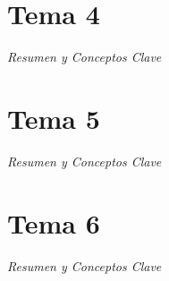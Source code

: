 \documentclass[a4paper,12pt]{article}
\begin{document}
\section{Tema 4}
\begin{center}
    \vspace*{2cm}
    \vspace*{1cm}
    \Large\textit{Resumen y Conceptos Clave}
    \vspace*{2cm}
\end{center}
\newpage


\section{Tema 5}
\begin{center}
    \vspace*{2cm}
    \vspace*{1cm}
    \Large\textit{Resumen y Conceptos Clave}
    \vspace*{2cm}
\end{center}
\newpage


\section{Tema 6}
\begin{center}
    \vspace*{2cm}
    \vspace*{1cm}
    \Large\textit{Resumen y Conceptos Clave}
    \vspace*{2cm}
\end{center}
\newpage

\end{document}
